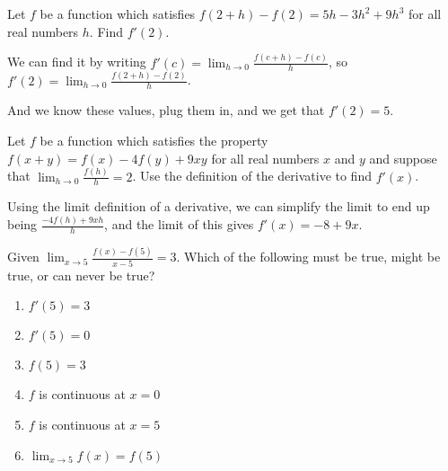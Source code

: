 \documentclass[../bccalc.tex]{subfiles}
\begin{document}
\begin{example}
    Let $f$ be a function which satisfies $f(2+h)-f(2)=5h-3h^2+9h^3$ for all real numbers $h$. Find $f'(2)$.

    We can find it by writing $f'(c)=\lim_{h\to 0}\frac{f(c+h)-f(c)}{h}$, so $f'(2)=\lim_{h\to 0}\frac{f(2+h)-f(2)}{h}$.

    And we know these values, plug them in, and we get that $f'(2)=5$.
\end{example}

\begin{example}
    Let $f$ be a function which satisfies the property $f(x+y)=f(x)-4f(y)+9xy$ for all real numbers $x$ and $y$ and suppose that $\lim_{h\to 0}\frac{f(h)}{h}=2$. Use the definition of the derivative to find $f'(x)$.

    Using the limit definition of a derivative, we can simplify the limit to end up being $\frac{-4f(h)+9xh}{h}$, and the limit of this gives $f'(x)=-8+9x$.
\end{example}

\ex Given $\lim_{x\to 5}\frac{f(x)-f(5)}{x-5}=3$. Which of the following must be true, might be true, or can never be true?
\begin{enumerate}
    \item $f'(5)=3$
    \item $f'(5)=0$
    \item $f(5)=3$
    \item $f$ is continuous at $x=0$
    \item $f$ is continuous at $x=5$
    \item $\lim_{x\to 5}f(x)=f(5)$
\end{enumerate}
\end{document}
